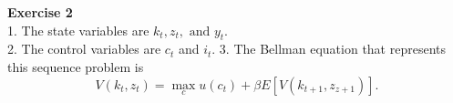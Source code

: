 \documentclass[letterpaper,12pt]{article}
\theoremstyle{definition}
\begin{document}
\vspace{3mm}

\textbf{Exercise 2} \\
1. The state variables are $k_t, z_t, \text{ and } y_t$. \\
2. The control variables are $c_t$ and $i_t$.
3. The Bellman equation that represents this sequence problem is
\begin{equation*}
  V(k_t, z_t) = \max_{c} u(c_t) + \beta E[V(k_{t+1}, z_{z+1})] .
\end{equation*}

\begin{figure}[H]\centering\captionsetup{width=0in}
\end{figure}
\end{document}
